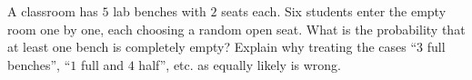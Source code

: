 A classroom has $5$ lab benches with $2$ seats each. Six students enter the empty room one by one, each choosing a random open seat. What is the probability that at least one bench is completely empty? Explain why treating the cases ``$3$ full benches'', ``$1$ full and $4$ half'', etc. as equally likely is wrong.
